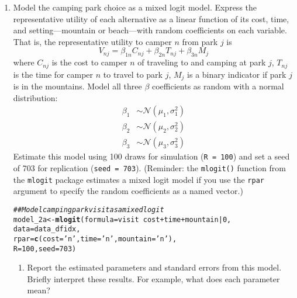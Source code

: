 \documentclass[11pt,letterpaper]{article}\usepackage[]{graphicx}\usepackage[]{color}
\makeatletter
\newcommand{\hlnum}[1]{\textcolor[rgb]{0.686,0.059,0.569}{#1}}%
\newcommand{\hlstr}[1]{\textcolor[rgb]{0.192,0.494,0.8}{#1}}%
\newcommand{\hlcom}[1]{\textcolor[rgb]{0.678,0.584,0.686}{\textit{#1}}}%
\newcommand{\hlopt}[1]{\textcolor[rgb]{0,0,0}{#1}}%
\newcommand{\hlstd}[1]{\textcolor[rgb]{0.345,0.345,0.345}{#1}}%
\newcommand{\hlkwb}[1]{\textcolor[rgb]{0.69,0.353,0.396}{#1}}%
\newcommand{\hlkwc}[1]{\textcolor[rgb]{0.333,0.667,0.333}{#1}}%
\newcommand{\hlkwd}[1]{\textcolor[rgb]{0.737,0.353,0.396}{\textbf{#1}}}%
\newenvironment{kframe}{%
 \def\at@end@of@kframe{}%
 \ifinner\ifhmode%
  \def\at@end@of@kframe{\end{minipage}}%
  \begin{minipage}{\columnwidth}%
 \fi\fi%
 \def\FrameCommand##1{\hskip\@totalleftmargin \hskip-\fboxsep
 \colorbox{shadecolor}{##1}\hskip-\fboxsep
     \hskip-\linewidth \hskip-\@totalleftmargin \hskip\columnwidth}%
 \MakeFramed {\advance\hsize-\width
   \@totalleftmargin\z@ \linewidth\hsize
   \@setminipage}}%
 {\par\unskip\endMakeFramed%
 \at@end@of@kframe}
\newenvironment{knitrout}{}{} %
\makeatother
\begin{document}
\begin{enumerate}[label=\alph*., leftmargin=*]

	\item Model the camping park choice as a mixed logit model. Express the representative utility of each alternative as a linear function of its cost, time, and setting---mountain or beach---with random coefficients on each variable. That is, the representative utility to camper $n$ from park $j$ is
	$$V_{nj} = \beta_{1n} C_{nj} + \beta_{2n} T_{nj} + \beta_{3n} M_j$$
	where $C_{nj}$ is the cost to camper $n$ of traveling to and camping at park $j$, $T_{nj}$ is the time for camper $n$ to travel to park $j$, $M_j$ is a binary indicator if park $j$ is in the mountains. Model all three $\beta$ coefficients as random with a normal distribution:
	\begin{align*}
		\beta_1 & \sim \mathcal{N}(\mu_1, \sigma_1^2) \\
		\beta_2 & \sim \mathcal{N}(\mu_2, \sigma_2^2) \\
		\beta_3 & \sim \mathcal{N}(\mu_3, \sigma_3^2)
	\end{align*}
	Estimate this model using 100 draws for simulation (\texttt{R = 100}) and set a seed of 703 for replication (\texttt{seed = 703}). (Reminder: the \texttt{mlogit()} function from the \texttt{mlogit} package estimates a mixed logit model if you use the \texttt{rpar} argument to specify the random coefficients as a named vector.)

\begin{knitrout}
\color{fgcolor}\begin{kframe}
\begin{alltt}
\hlcom{## Model camping park visit as a mixed logit}
\hlstd{model_2a} \hlkwb{<-} \hlkwd{mlogit}\hlstd{(}\hlkwc{formula} \hlstd{= visit} \hlopt{~} \hlstd{cost} \hlopt{+} \hlstd{time} \hlopt{+} \hlstd{mountain} \hlopt{|} \hlnum{0}\hlstd{,}
                   \hlkwc{data} \hlstd{= data_dfidx,}
                   \hlkwc{rpar} \hlstd{=} \hlkwd{c}\hlstd{(}\hlkwc{cost} \hlstd{=} \hlstr{'n'}\hlstd{,} \hlkwc{time} \hlstd{=} \hlstr{'n'}\hlstd{,} \hlkwc{mountain} \hlstd{=} \hlstr{'n'}\hlstd{),}
                   \hlkwc{R} \hlstd{=} \hlnum{100}\hlstd{,} \hlkwc{seed} \hlstd{=} \hlnum{703}\hlstd{)}
\end{alltt}
\end{kframe}
\end{knitrout}

	\begin{enumerate}[label=\roman*.]
		\item Report the estimated parameters and standard errors from this model. Briefly interpret these results. For example, what does each parameter mean?


\end{enumerate}
\end{enumerate}
\end{document}
